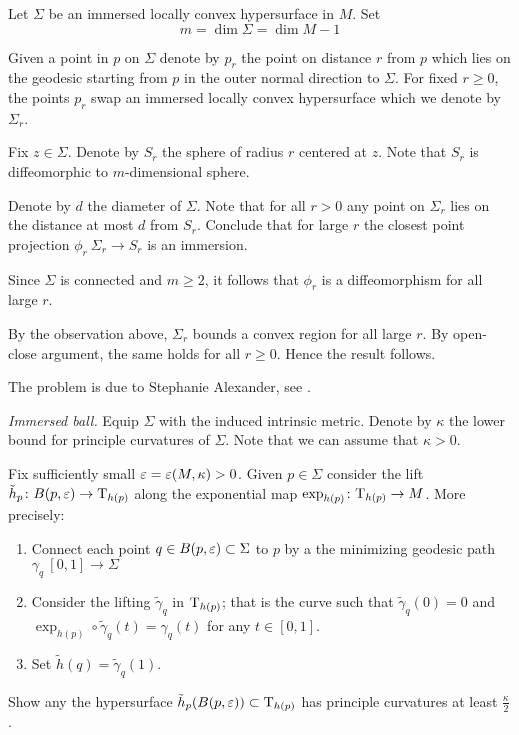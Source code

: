Let $\Sigma$ be an immersed locally convex hypersurface in $M$.
Set 
\[m=\dim \Sigma=\dim M-1\]

Given a point in $p$ on $\Sigma$ 
denote by $p_r$ the point on distance $r$ from $p$
which lies on the geodesic starting from $p$ in the outer normal direction to $\Sigma$.
For fixed $r\ge 0$,
the points $p_r$ swap an immersed locally convex hypersurface which we denote by $\Sigma_r$.

Fix $z\in \Sigma$.
Denote by $S_r$ the sphere of radius $r$ centered at $z$.
Note that $S_r$ is diffeomorphic to $m$-dimensional sphere.

Denote by $d$ the diameter of $\Sigma$.
Note that for all $r>0$
any point on $\Sigma_r$
lies on the distance at most $d$ from $S_r$.
Conclude that for large $r$ the closest point projection $\phi_r\:\Sigma_r\to S_r$ is an immersion.


Since $\Sigma$ is connected
and $m\ge 2$, it follows that $\phi_r$ is a diffeomorphism for all large $r$.

By the observation above, $\Sigma_r$ bounds a convex region for all large $r$.
By open-close argument, the same holds for all $r\ge 0$.
Hence the result follows.

The problem is due to Stephanie Alexander, see \cite{alexander}.



\textit{Immersed ball.}
Equip $\Sigma$ with the induced intrinsic metric.
Denote by $\kappa$ the lower bound for principle curvatures of $\Sigma$.
Note that we can assume that $\kappa>0$.

Fix sufficiently small $\varepsilon=\varepsilon(M,\kappa)>0$.
Given $p\in \Sigma$ consider the lift $\tilde h_p\colon B(p,\varepsilon)\to \mathrm{T}_{h(p)}$ along the exponential map $\exp_{h(p)}\colon\mathrm{T}_{h(p)}\to M$.
More precisely:
\begin{enumerate}
\item Connect each point $q\in B(p,\varepsilon)\subset \Sigma$ to $p$
by a the minimizing geodesic  path $\gamma_q\:[0,1]\to \Sigma$
\item Consider the lifting $\tilde\gamma_q$ in $\mathrm{T}_{h(p)}$; 
that is the curve such that $\tilde\gamma_q(0)=0$ and $\exp_{h(p)}\circ\tilde\gamma_q(t)=\gamma_q(t)$ for any $t\in[0,1]$.
 \item Set $\tilde h(q)=\tilde\gamma_q(1)$.
\end{enumerate}

Show any the hypersurface $\tilde h_p(B(p,\varepsilon))\subset \mathrm{T}_{h(p)}$ has principle curvatures at least $\tfrac\kappa2$.


